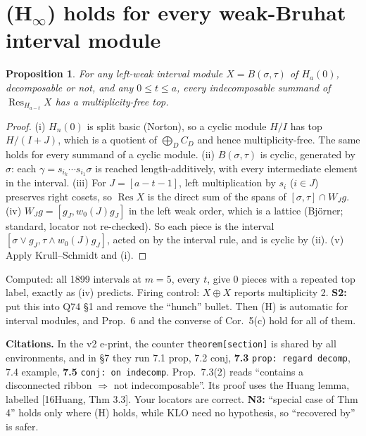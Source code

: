 \documentclass[11pt]{article}
\newcommand{\Res}{\operatorname{Res}}
\newtheorem{proposition}{Proposition}
\begin{document}
\section{(H$_\infty$) holds for every weak-Bruhat interval module}
\begin{proposition}
For any left-weak interval module $X=B(\sigma,\tau)$ of $H_a(0)$, decomposable or not, and any $0\le t\le a$, every indecomposable summand of $\Res_{H_{a-t}}X$ has a multiplicity-free top.
\end{proposition}
\begin{proof}
(i) $H_n(0)$ is split basic (Norton), so a cyclic module $H/I$ has top $H/(I+J)$, which is a quotient of $\bigoplus_D C_D$ and hence multiplicity-free. The same holds for every summand of a cyclic module.
(ii) $B(\sigma,\tau)$ is cyclic, generated by $\sigma$: each $\gamma=s_{i_k}\cdots s_{i_1}\sigma$ is reached length-additively, with every intermediate element in the interval.
(iii) For $J=[a-t-1]$, left multiplication by $s_i$ ($i\in J$) preserves right cosets, so $\Res X$ is the direct sum of the spans of $[\sigma,\tau]\cap W_Jg$.
(iv) $W_Jg=[g_J,w_0(J)g_J]$ in the left weak order, which is a lattice (Bj\"orner; standard, locator not re-checked). So each piece is the interval $[\sigma\vee g_J,\tau\wedge w_0(J)g_J]$, acted on by the interval rule, and is cyclic by (ii).
(v) Apply Krull--Schmidt and (i).
\end{proof}
Computed: all 1899 intervals at $m=5$, every $t$, give 0 pieces with a repeated top label, exactly as (iv) predicts. Firing control: $X\oplus X$ reports multiplicity 2. \textbf{S2:} put this into Q74 \S1 and remove the ``hunch'' bullet. Then (H) is automatic for interval modules, and Prop.~6 and the converse of Cor.~5(c) hold for all of them.

\textbf{Citations.} In the v2 e-print, the counter \texttt{theorem[section]} is shared by all environments, and in \S7 they run 7.1 prop, 7.2 conj, \textbf{7.3} \texttt{prop: regard decomp}, 7.4 example, \textbf{7.5} \texttt{conj: on indecomp}. Prop.~7.3(2) reads ``contains a disconnected ribbon $\Rightarrow$ not indecomposable''. Its proof uses the Huang lemma, labelled [16Huang, Thm 3.3]. Your locators are correct. \textbf{N3:} ``special case of Thm 4'' holds only where (H) holds, while KLO need no hypothesis, so ``recovered by'' is safer.
\end{document}
